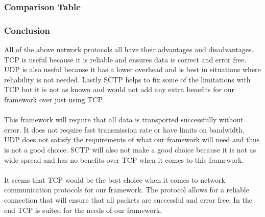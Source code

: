 \documentclass[draftclsnofoot, onecolumn, compsoc, 10pt]{IEEEtran}
\begin{document}
\subsubsection{Comparison Table}
\FloatBarrier
\begin{table}[H]
\fontsize{3}{4}\selectfont
\centering
\def\arraystretch{1.2}
\newline\newline 
\end{table}
\subsubsection{Conclusion}
All of the above network protocols all have their advantages and disadvantages. TCP is useful because it is reliable and ensures data is correct and error free. UDP is also useful because it has a lower overhead and is best in situations where reliability is not needed. Lastly SCTP helps to fix some of the limitations with TCP but it is not as known and would not add any extra benefits for our framework over just using TCP.
\\ \\
This framework will require that all data is transported successfully without error. It does not require fast transmission rate or have limits on bandwidth. UDP does not satisfy the requirements of what our framework will need and thus is not a good choice. SCTP will also not make a good choice because it is not as wide spread and has no benefits over TCP when it comes to this framework. 
\\ \\
It seems that TCP would be the best choice when it comes to network communication protocols for our framework. The protocol allows for a reliable connection that will ensure that all packets are successful and error free. In the end TCP is suited for the needs of our framework.
\end{document}
